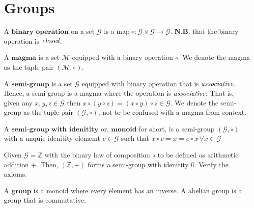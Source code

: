 \section{Groups} %
\label{sec:groups}

\begin{defn}
 A $\textbf{binary operation}$ on a set $\mathcal{G}$ is a map
 $\circ : \mathcal{G} \times \mathcal{G} \to \mathcal{G}$.
 $\textbf{N.B.}$ that the binary operation is $\emph{closed}$.
\end{defn}

\begin{defn}[Magma]
 A $\textbf{magma}$ is a set $\mathcal{M}$ equipped with a binary operation $\circ$.
 We denote the magma as the tuple pair $(\mathcal{M}, \circ)$.
\end{defn}


\begin{defn}
 A $\textbf{semi-group}$ is a set $\mathcal{G}$ equipped with binary operation that is $\emph{associative}$.
 Hence, a semi-group is a magma where the operation is $\emph{associative}$;
 That is, given any $x,y,z \in \mathcal{G}$ then $x \circ (y \circ z) = (x \circ y) \circ z \in \mathcal{G}$.
 We denote the semi-group as the tuple pair $(\mathcal{G}, \circ)$, not to be confused with a magma from context.
\end{defn}

\begin{defn}[Monoid]
 A $\textbf{semi-group with idenitity}$ or, $\textbf{monoid}$ for short, is a semi-group $(\mathcal{G}, \circ)$
 with a unquie idenitity elememt $e \in \mathcal{G}$ such that $x \circ e = x = e \circ x \, \forall x \in \mathcal{G}$
\end{defn}




\begin{exmp}
 Given $\mathcal{G} = \mathbb{Z}$ with the binary law of composition $\circ$ to be defined as arithmetic addition $+$.
 Then, $(\mathbb{Z}, +)$ forms a semi-group with idenitity $0$. Verify the axioms.
\end{exmp}


\begin{defn}[Group]
 A $\textbf{group}$ is a monoid where every element has an inverse. A abelian group is a group that is commutative.
\end{defn}




